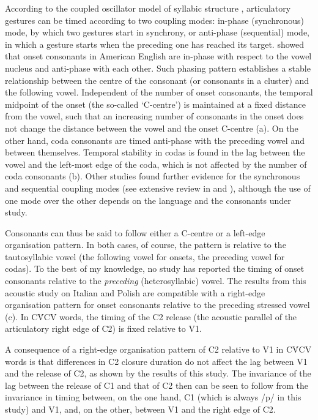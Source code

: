 \documentclass[12pt,]{article}
\begin{document}
According to the coupled oscillator model of syllabic structure
\citep{browman1988, browman2000, goldstein2006, goldstein2014},
articulatory gestures can be timed according to two coupling modes:
in-phase (synchronous) mode, by which two gestures start in synchrony,
or anti-phase (sequential) mode, in which a gesture starts when the
preceding one has reached its target. \citet{marin2010} showed that
onset consonants in American English are in-phase with respect to the
vowel nucleus and anti-phase with each other. Such phasing pattern
establishes a stable relationship between the centre of the consonant
(or consonants in a cluster) and the following vowel. Independent of the
number of onset consonants, the temporal midpoint of the onset (the
so-called `C-centre') is maintained at a fixed distance from the vowel,
such that an increasing number of consonants in the onset does not
change the distance between the vowel and the onset C-centre
(a). On the other hand, coda consonants are timed
anti-phase with the preceding vowel and between themselves. Temporal
stability in codas is found in the lag between the vowel and the
left-most edge of the coda, which is not affected by the number of coda
consonants (b). Other studies found further
evidence for the synchronous and sequential coupling modes (see
extensive review in \citealt{marin2010} and \citealt{marin2014}),
although the use of one mode over the other depends on the language and
the consonants under study.

Consonants can thus be said to follow either a C-centre or a left-edge
organisation pattern. In both cases, of course, the pattern is relative
to the tautosyllabic vowel (the following vowel for onsets, the
preceding vowel for codas). To the best of my knowledge, no study has
reported the timing of onset consonants relative to the \emph{preceding}
(heterosyllabic) vowel. The results from this acoustic study on Italian
and Polish are compatible with a right-edge organisation pattern for
onset consonants relative to the preceding stressed vowel
(c). In CV́CV words, the timing of the C2 release
(the acoustic parallel of the articulatory right edge of C2) is fixed
relative to V1.

A consequence of a right-edge organisation pattern of C2 relative to V1
in CV́CV words is that differences in C2 closure duration do not affect
the lag between V1 and the release of C2, as shown by the results of
this study. The invariance of the lag between the release of C1 and that
of C2 then can be seen to follow from the invariance in timing between,
on the one hand, C1 (which is always /p/ in this study) and V1, and, on
the other, between V1 and the right edge of C2.
\end{document}

